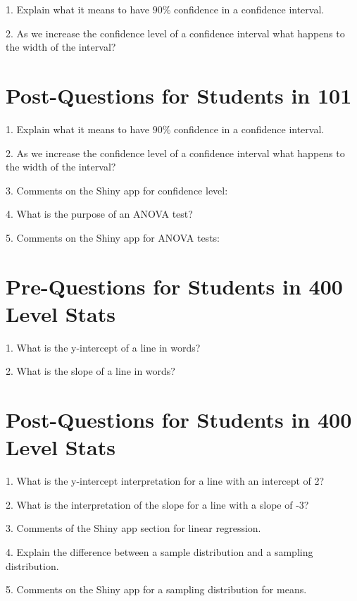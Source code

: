 \documentclass[11pt]{amsart}
\begin{document}
1. Explain what it means to have $90\%$ confidence in a confidence interval.


2. As we increase the confidence level of a confidence interval what happens to the width of the interval?



\section{Post-Questions for Students in 101}

1. Explain what it means to have $90\%$ confidence in a confidence interval.


2. As we increase the confidence level of a confidence interval what happens to the width of the interval?


3. Comments on the Shiny app for confidence level:


4. What is the purpose of an ANOVA test?


5. Comments on the Shiny app for ANOVA tests:




\section{Pre-Questions for Students in 400 Level Stats}

1. What is the y-intercept of a line in words?

2. What is the slope of a line in words?


\section{Post-Questions for Students in 400 Level Stats}

1.  What is the y-intercept interpretation for a line with an intercept of 2?

2. What is the interpretation of the slope for a line with a slope of -3?

3. Comments of the Shiny app section for linear regression.


4. Explain the difference between a sample distribution and a sampling distribution.


5. Comments on the Shiny app for a sampling distribution for means.
\end{document}
